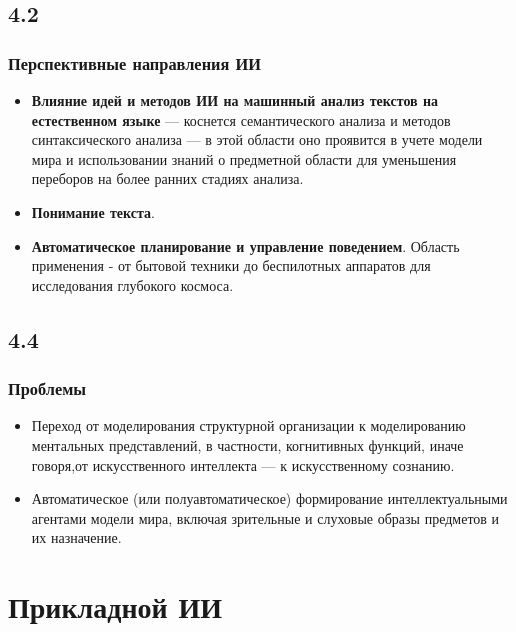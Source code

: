 \documentclass[default]{beamer}
\begin{document}
	\subsection{4.2}
	\begin{frame}
		\frametitle{Перспективные направления ИИ}
		
		\begin{itemize}
			\item \textbf{Влияние идей и методов ИИ на машинный анализ текстов на естественном языке} --- коснется  семантического анализа и методов синтаксического анализа --- в этой области оно проявится в учете модели мира и использовании знаний о предметной области  для уменьшения переборов  на более ранних стадиях анализа.
			\item \textbf{Понимание текста}.
			\item \textbf{Автоматическое планирование и управление поведением}. Область применения  - от бытовой  техники до беспилотных аппаратов для исследования глубокого космоса.
		\end{itemize}
		
	\end{frame}

	\subsection{4.4}
	\begin{frame}
		\frametitle{Проблемы}
		
		\begin{itemize}
			\item Переход от моделирования структурной организации к моделированию ментальных представлений, в частности, когнитивных функций, иначе говоря,от искусственного интеллекта --- к искусственному сознанию.
			\item Автоматическое (или полуавтоматическое) формирование интеллектуальными агентами модели мира, включая зрительные и слуховые образы предметов и их назначение.

		\end{itemize}
		
	\end{frame}

	\section{Прикладной ИИ}
\end{document}
